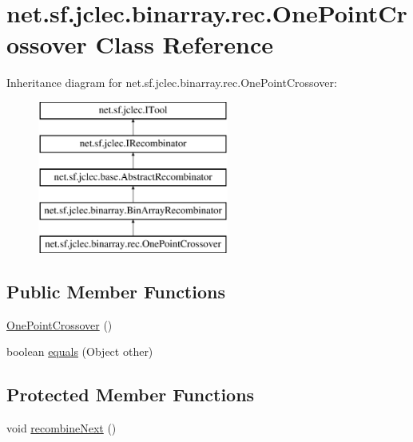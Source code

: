 \hypertarget{classnet_1_1sf_1_1jclec_1_1binarray_1_1rec_1_1_one_point_crossover}{\section{net.\-sf.\-jclec.\-binarray.\-rec.\-One\-Point\-Crossover Class Reference}
\label{classnet_1_1sf_1_1jclec_1_1binarray_1_1rec_1_1_one_point_crossover}
}
Inheritance diagram for net.\-sf.\-jclec.\-binarray.\-rec.\-One\-Point\-Crossover\-:\begin{figure}[H]
\begin{center}
\leavevmode
\includegraphics[height=5.000000cm]{classnet_1_1sf_1_1jclec_1_1binarray_1_1rec_1_1_one_point_crossover}
\end{center}
\end{figure}
\subsection*{Public Member Functions}
\begin{DoxyCompactItemize}
\item 
\hyperlink{classnet_1_1sf_1_1jclec_1_1binarray_1_1rec_1_1_one_point_crossover_a6a44c4d32cf5e1f5e61e935aaad6eaf4}{One\-Point\-Crossover} ()
\item 
boolean \hyperlink{classnet_1_1sf_1_1jclec_1_1binarray_1_1rec_1_1_one_point_crossover_a79b0cf47378e2e3be5e0bf0dec54fb4e}{equals} (Object other)
\end{DoxyCompactItemize}
\subsection*{Protected Member Functions}
\begin{DoxyCompactItemize}
\item 
void \hyperlink{classnet_1_1sf_1_1jclec_1_1binarray_1_1rec_1_1_one_point_crossover_a37d66cb3130d54b9b95c1316de4d4b31}{recombine\-Next} ()
\end{DoxyCompactItemize}
